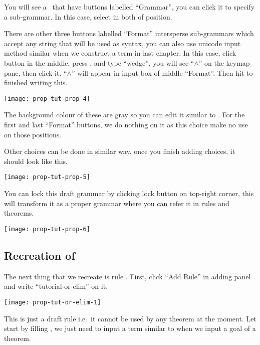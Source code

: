 \documentclass[master.tex]{subfiles}
\begin{document}
You will see a \kChoice\ that have buttons labelled ``Grammar'', you can
click it to specify a sub-grammar. In this case, select  in
both of position.

There are other three buttons labelled ``Format'' intersperse sub-grammars which
accept any string that will be used as syntax, you can also use unicode input
method similar when we construct a term in last chapter. In this case, click
button in the middle, press , and type ``wedge'', you will see
``$\wedge$'' on the keymap pane, then click it. ``$\wedge$'' will appear in
input box of middle ``Format''. Then hit  to finished writing this.

\begin{center}
  \texttt{[image: prop-tut-prop-4]}
\end{center}

The background colour of these are gray so you can edit it similar to
\kMetaVarRegex. For the first and last ``Format'' buttons, we do nothing on it
as this choice make no use on those positions.

Other choices can be done in similar way, once you finish adding choices, it
should look like this.

\begin{center}
  \texttt{[image: prop-tut-prop-5]}
\end{center}

You can lock this draft grammar by clicking lock button on top-right corner,
this will transform it as a proper grammar where you can refer it in rules and
theorems.

\begin{center}
  \texttt{[image: prop-tut-prop-6]}
\end{center}

\subsection{Recreation of }

The next thing that we recreate is rule . First, click ``Add
Rule'' in adding panel and write ``tutorial-or-elim'' on it.

\begin{center}
  \texttt{[image: prop-tut-or-elim-1]}
\end{center}

This is just a draft rule i.e.\ it cannot be used by any theorem at the moment.
Let start by filling \kConclusion, we just need to input a term similar to when
we input a goal of a theorem.
\end{document}
